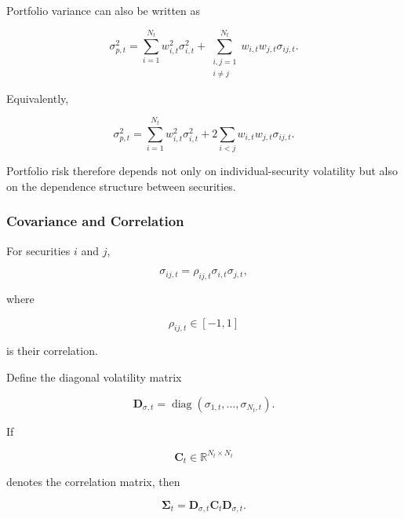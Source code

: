 \documentclass[11pt,a4paper]{article}
\begin{document}
Portfolio variance can also be written as

\begin{equation}
\sigma_{p,t}^{2}
=
\sum_{i=1}^{N_t}
w_{i,t}^{2}
\sigma_{i,t}^{2}
+
\sum_{\substack{i,j=1\\i\neq j}}^{N_t}
w_{i,t}w_{j,t}
\sigma_{ij,t}.
\end{equation}

Equivalently,

\begin{equation}
\boxed{
\sigma_{p,t}^{2}
=
\sum_{i=1}^{N_t}
w_{i,t}^{2}
\sigma_{i,t}^{2}
+
2
\sum_{i<j}
w_{i,t}w_{j,t}
\sigma_{ij,t}.
}
\end{equation}

Portfolio risk therefore depends not only on individual-security volatility but
also on the dependence structure between securities.


\subsubsection{Covariance and Correlation}

For securities $i$ and $j$,

\begin{equation}
\boxed{
\sigma_{ij,t}
=
\rho_{ij,t}
\sigma_{i,t}
\sigma_{j,t},
}
\end{equation}

where

\begin{equation}
\rho_{ij,t}
\in[-1,1]
\end{equation}

is their correlation.

Define the diagonal volatility matrix

\begin{equation}
\mathbf{D}_{\sigma,t}
=
\operatorname{diag}
\left(
\sigma_{1,t},
\ldots,
\sigma_{N_t,t}
\right).
\end{equation}

If

\begin{equation}
\mathbf{C}_t
\in
\mathbb{R}^{N_t\times N_t}
\end{equation}

denotes the correlation matrix, then

\begin{equation}
\boxed{
\boldsymbol{\Sigma}_t
=
\mathbf{D}_{\sigma,t}
\mathbf{C}_t
\mathbf{D}_{\sigma,t}.
}
\end{equation}
\end{document}
